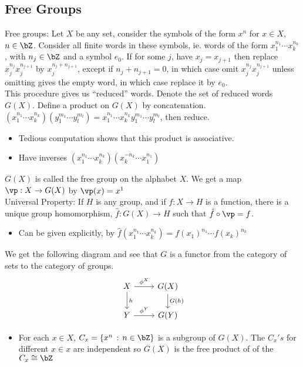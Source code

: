 
\subsection{Free Groups}

Free groups: Let $X$ be any set, consider the symbols of the form $x^n$ for $x \in X$, $n \in \bZ$. Consider all finite words in these symbols, ie. words of the form $x_1^{n_1} \cdots x_{k}^{n_k}$, with $n_j \in \bZ$ and a symbol $e_0$. If for some $j$, have $x_j = x_{j+1}$ then replace $x_j^{n_j}x_{j}^{n_{j+1}}$ by $x_j^{n_j + n_{j+1}}$, except if $n_j + n_{j+1}=0$, in which case omit $x_j^{n_j}x_{j}^{n_{j+1}}$ unless omitting gives the empty word, in which case replace it by $e_0$. \\
This procedure gives us ``reduced'' words. Denote the set of reduced words $G(X)$. Define a product on $G(X)$ by concatenation. $(x_1^{n_1} \cdots x_k^{n_k})(y_1^{m_1} \cdots y_l^{m_l}) = x_1^{n_1} \cdots x_k^{n_k}y_1^{m_1} \cdots y_l^{m_l}$, then reduce. 
\begin{itemize}
    \item Tedious computation shows that this product is associative. 
    \item Have inverses $(x_1^{n_1} \cdots x_k^{n_k})(x_k^{-n_k} \cdots x_1^{n_1})$ 
\end{itemize}
$G(X)$ is called the free group on the alphabet $X$. We get a map $\vp: X \to G(X)$ by $\vp(x) = x^1$ \\
Universal Property: If $H$ is any group, and if $f: X \to H$ is a function, there is a unique group homomorphism, $\hat{f}: G(X) \to H$ such that $\hat{f} \circ \vp = f$. 
\begin{itemize}
    \item Can be given explicitly, by $\hat{f}(x_1^{n_1} \cdots x_k^{n_k}) = f(x_1)^{n_1} \cdots f(x_k)^{n_k}$ 
\end{itemize}

\noindent
We get the following diagram and see that $G$ is a functor from the category of sets to the category of groups. 
\[\begin{tikzcd}
    X \arrow[r, "\phi^{X}"] \arrow[d, "h"] & G(X) \arrow[d, "G(h)"] \\ 
    Y \arrow[r, "\phi^{Y}"] & G(Y)
\end{tikzcd} \]

\begin{itemize}
    \item For each $x \in X$, $C_x = \{x^n \, : \, n \in \bZ\}$ is a subgroup of $G(X)$. The $C_x's$ for different $x \in x$ are independent so $G(X)$ is the free product of of the $C_x \cong \bZ$ 
\end{itemize}

